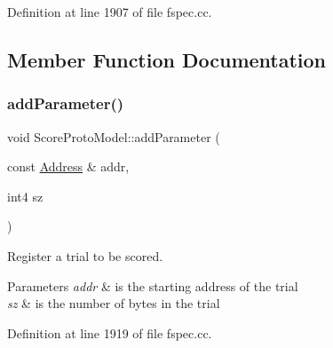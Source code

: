 Definition at line 1907 of file fspec.\+cc.



\subsection{Member Function Documentation}
\mbox{\label{class_score_proto_model_aac1568db9b3ebba5747ad8eba5f6438f}} 
\subsubsection{\texorpdfstring{addParameter()}{addParameter()}}
{\footnotesize\ttfamily void Score\+Proto\+Model\+::add\+Parameter (\begin{DoxyParamCaption}\item[{const \mbox{\hyperlink{class_address}{Address}} \&}]{addr,  }\item[{int4}]{sz }\end{DoxyParamCaption})}



Register a trial to be scored. 


\begin{DoxyParams}{Parameters}
{\em addr} & is the starting address of the trial \\
\hline
{\em sz} & is the number of bytes in the trial \\
\hline
\end{DoxyParams}


Definition at line 1919 of file fspec.\+cc.

